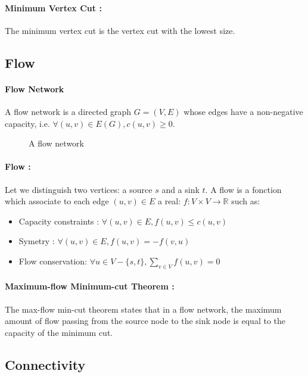 \paragraph{Minimum Vertex Cut :}
The minimum vertex cut is the vertex cut with the lowest size.

\subsection{Flow}
\paragraph{Flow Network}
A flow network is a directed graph $G=(V,E)$ whose edges have a non-negative
capacity, i.e. $\forall (u,v) \in E(G), c(u,v) \geq 0$.

\begin{figure}[!h]
  \begin{center}
    
  \end{center}
  \caption{A flow network}
\end{figure}

\paragraph{Flow :}
Let we distinguish two vertices: a source $s$ and a sink $t$.
A flow is a fonction which associate to each edge $(u,v) \in E$ a real:
$f: V \times V \rightarrow \mathbb{R}$ such as:
\begin{itemize}
    \item Capacity constraints : $\forall (u,v) \in E, f(u,v) \leq c(u,v)$
    \item Symetry : $\forall (u,v) \in E, f(u,v) = - f(v,u) $
    \item Flow conservation: $\forall u \in V - \{s,t\}, \sum_{v \in V}f(u,v) = 0$ 
\end{itemize}


\paragraph{Maximum-flow Minimum-cut Theorem :}
The max-flow min-cut theorem states that in a flow network, the maximum amount
of flow passing from the source node to the sink node is equal to the capacity
of the minimum cut.


\subsection{Connectivity}
